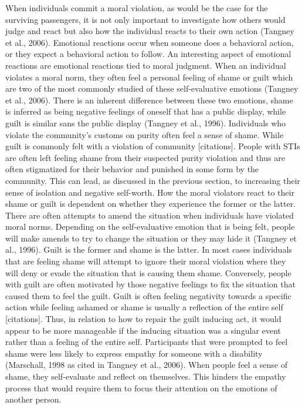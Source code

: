 \documentclass[
  donotrepeattitle,doc, 12pt, a4paper,floatsintext]{apa7}
\begin{document}
When individuals commit a moral violation, as would be the case for the surviving passengers, it is not only important to investigate how others would judge and react but also how the individual reacts to their own action (Tangney et al., 2006). Emotional reactions occur when someone does a behavioral action, or they expect a behavioral action to follow. An interesting aspect of emotional reactions are emotional reactions tied to moral judgment. When an individual violates a moral norm, they often feel a personal feeling of shame or guilt which are two of the most commonly studied of these self-evaluative emotions (Tangney et al., 2006). There is an inherent difference between these two emotions, shame is inferred as being negative feelings of oneself that has a public display, while guilt is similar sans the public display (Tangney et al., 1996). Individuals who violate the community's customs on purity often feel a sense of shame. While guilt is commonly felt with a violation of community {[}citations{]}. People with STIs are often left feeling shame from their suspected purity violation and thus are often stigmatized for their behavior and punished in some form by the community. This can lead, as discussed in the previous section, to increasing their sense of isolation and negative self-worth. How the moral violators react to their shame or guilt is dependent on whether they experience the former or the latter.
There are often attempts to amend the situation when individuals have violated moral norms. Depending on the self-evaluative emotion that is being felt, people will make amends to try to change the situation or they may hide it (Tangney et al., 1996). Guilt is the former and shame is the latter. In most cases individuals that are feeling shame will attempt to ignore their moral violation where they will deny or evade the situation that is causing them shame. Conversely, people with guilt are often motivated by those negative feelings to fix the situation that caused them to feel the guilt. Guilt is often feeling negativity towards a specific action while feeling ashamed or shame is usually a reflection of the entire self {[}citations{]}. Thus, in relation to how to repair the guilt inducing act, it would appear to be more manageable if the inducing situation was a singular event rather than a feeling of the entire self. Participants that were prompted to feel shame were less likely to express empathy for someone with a disability (Marschall, 1998 as cited in Tangney et al., 2006). When people feel a sense of shame, they self-evaluate and reflect on themselves. This hinders the empathy process that would require them to focus their attention on the emotions of another person.
\end{document}
